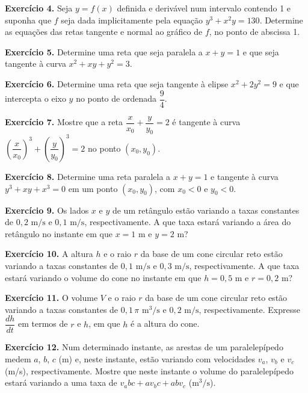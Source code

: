 \documentclass[12pt,a4paper]{article}
\begin{document}
\vspace{0.5cm}
\noindent\textbf{Exercício 4.}
Seja $y = f(x)$ definida e derivável num intervalo contendo 1 e suponha que $f$ seja dada implicitamente pela equação $y^3 + x^2 y = 130$. Determine as equações das retas tangente e normal ao gráfico de $f$, no ponto de abscissa 1.

\vspace{0.5cm}
\noindent\textbf{Exercício 5.}
Determine uma reta que seja paralela a $x + y = 1$ e que seja tangente à curva $x^2 + xy + y^2 = 3$.

\vspace{0.5cm}
\noindent\textbf{Exercício 6.}
Determine uma reta que seja tangente à elipse $x^2 + 2y^2 = 9$ e que intercepta o eixo $y$ no ponto de ordenada $\dfrac{9}{4}$.

\vspace{0.5cm}
\noindent\textbf{Exercício 7.}
Mostre que a reta $\dfrac{x}{x_0} + \dfrac{y}{y_0} = 2$ é tangente à curva $\left(\dfrac{x}{x_0}\right)^{\!3} + \left(\dfrac{y}{y_0}\right)^{\!3} = 2$ no ponto $(x_0, y_0)$.

\vspace{0.5cm}
\noindent\textbf{Exercício 8.}
Determine uma reta paralela a $x + y = 1$ e tangente à curva $y^3 + xy + x^3 = 0$ em um ponto $(x_0, y_0)$, com $x_0 < 0$ e $y_0 < 0$.

\vspace{0.5cm}
\noindent\textbf{Exercício 9.}
Os lados $x$ e $y$ de um retângulo estão variando a taxas constantes de $0{,}2\text{ m/s}$ e $0{,}1\text{ m/s}$, respectivamente. A que taxa estará variando a área do retângulo no instante em que $x = 1\text{ m}$ e $y = 2\text{ m}$?

\vspace{0.5cm}
\noindent\textbf{Exercício 10.}
A altura $h$ e o raio $r$ da base de um cone circular reto estão variando a taxas constantes de $0{,}1\text{ m/s}$ e $0{,}3\text{ m/s}$, respectivamente. A que taxa estará variando o volume do cone no instante em que $h = 0{,}5\text{ m}$ e $r = 0{,}2\text{ m}$?

\vspace{0.5cm}
\noindent\textbf{Exercício 11.}
O volume $V$ e o raio $r$ da base de um cone circular reto estão variando a taxas constantes de $0{,}1\,\pi\text{ m}^3\text{/s}$ e $0{,}2\text{ m/s}$, respectivamente. Expresse $\dfrac{dh}{dt}$ em termos de $r$ e $h$, em que $h$ é a altura do cone.

\vspace{0.5cm}
\noindent\textbf{Exercício 12.}
Num determinado instante, as arestas de um paralelepípedo medem $a$, $b$, $c$ (m) e, neste instante, estão variando com velocidades $v_a$, $v_b$ e $v_c$ (m/s), respectivamente. Mostre que neste instante o volume do paralelepípedo estará variando a uma taxa de $v_a bc + a v_b c + ab v_c$ ($\text{m}^3\text{/s}$).
\end{document}
